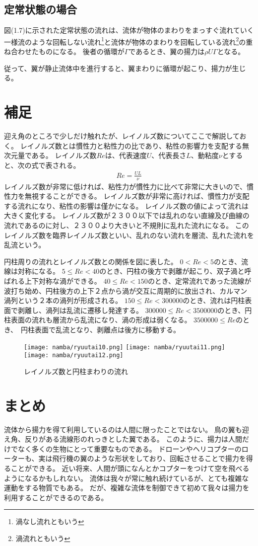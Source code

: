 \documentclass[10pt,b5paper,papersize,dvipdfmx]{jsbook}
\begin{document}
\subsection{定常状態の場合}
図(1.7)に示された定常状態の流れは、流体が物体のまわりをまっすぐ流れていく一様流のような回転しない流れ\footnote{渦なし流れともいう}と流体が物体のまわりを回転している流れ\footnote{渦流れともいう}の重ね合わせたものになる。
後者の循環が$\Gamma $であるとき、翼の揚力は$\rho U\Gamma$となる。
\par
\par
従って、翼が静止流体中を進行すると、翼まわりに循環が起こり、揚力が生じる。
\section{補足}
迎え角のところで少しだけ触れたが、レイノルズ数についてここで解説しておく。
レイノルズ数とは慣性力と粘性力の比であり、粘性の影響力を支配する無次元量である。
レイノルズ数$Re$は、代表速度$U$、代表長さ$L$、動粘度$\nu $とすると、次の式で表される。
\begin{align}
  Re = \frac{UL}{\nu }
\end{align}
レイノルズ数が非常に低ければ、粘性力が慣性力に比べて非常に大きいので、慣性力を無視することができる。
レイノルズ数が非常に高ければ、慣性力が支配する流れになり、粘性の影響は僅かになる。
レイノルズ数の値によって流れは大きく変化する。
レイノルズ数が２３００以下では乱れのない直線及び曲線の流れであるのに対し、２３００より大きいと不規則に乱れた流れになる。
このレイノルズ数を臨界レイノルズ数といい、乱れのない流れを層流、乱れた流れを乱流という。
\par
円柱周りの流れとレイノルズ数との関係を図に表した。
$0<Re<5$のとき、流線は対称になる。
$5\le Re<40$のとき、円柱の後方で剥離が起こり、双子渦と呼ばれる上下対称な渦ができる。
$40\le Re<150$のとき、定常流れであった流線が波打ち始め、円柱後方の上下２点から渦が交互に周期的に放出され、カルマン渦列という２本の渦列が形成される。
$150\le Re<300000$のとき、流れは円柱表面で剥離し、渦列は乱流に遷移し発達する。
$300000\le Re<3500000$のとき、円柱表面の流れも層流から乱流になり、渦の形成は弱くなる。
$3500000\le Re$のとき、　円柱表面で乱流となり、剥離点は後方に移動する。
\begin{figure}[ht]
  \centering
  \texttt{[image: namba/ryuutai10.png]}
  \centering
  \texttt{[image: namba/ryuutai11.png]}
  \centering
  \texttt{[image: namba/ryuutai12.png]}
  \caption{レイノルズ数と円柱まわりの流れ}
\end{figure}
\section{まとめ}
流体から揚力を得て利用しているのは人間に限ったことではない。
鳥の翼も迎え角、反りがある流線形のれっきとした翼である。
このように、揚力は人間だけでなく多くの生物にとって重要なものである。
ドローンやヘリコプターのローターも、実は飛行機の翼のような形状をしており、回転させることで揚力を得ることができる。
近い将来、人間が頭になんとかコプターをつけて空を飛べるようになるかもしれない。
流体は我々が常に触れ続けているが、とても複雑な運動をする物質でもある。
だが、複雑な流体を制御できて初めて我々は揚力を利用することができるのである。
\end{document}
